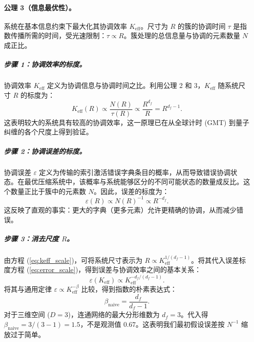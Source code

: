 \documentclass[12pt,a4paper]{article}
\theoremstyle{remark}
\newcommand{\Ke}{K_{\mathrm{eff}}}
\begin{document}
	\paragraph{公理 3（信息最优性）。}
	系统在基本信息约束下最大化其协调效率 \(\Ke\)。尺寸为 \(R\) 的簇的协调时间 \(\tau\) 是指数传播所需的时间，受光速限制：\(\tau \propto R\)。簇处理的总信息量与协调的元素数量 \(N\) 成正比。
	
	\subparagraph*{步骤 1：协调效率的标度。}
	协调效率 \(\Ke\) 定义为协调信息与协调时间之比。利用公理 2 和 3，\(\Ke\) 随系统尺寸 \(R\) 的标度为：
	\begin{equation}
		\Ke(R) \propto \frac{N(R)}{\tau(R)} \propto \frac{R^{d_f}}{R} = R^{d_f - 1}.
		\label{eq:keff_scale}
	\end{equation}
	这表明较大的系统具有较高的协调效率，这一原理已在从全球计时 (GMT) 到量子纠缠的各个尺度上得到验证。
	
	\subparagraph*{步骤 2：协调误差的标度。}
	协调误差 \(\varepsilon\) 定义为传输的索引激活错误字典条目的概率，从而导致错误协调状态。在最优压缩系统中，该概率与系统能够区分的不同可能状态的数量成反比。这个数量正比于簇中的元素数 \(N\)。因此，误差的标度为：
	\begin{equation}
		\varepsilon(R) \propto N(R)^{-1} \propto R^{-d_f}.
		\label{eq:error_scale}
	\end{equation}
	这反映了直观的事实：更大的字典（更多元素）允许更精确的协调，从而减少错误。
	
	\subparagraph*{步骤 3：消去尺度 \(R\)。}
	由方程 (\ref{eq:keff_scale})，可将系统尺寸表示为 \(R \propto \Ke^{1/(d_f-1)}\)。将其代入误差标度方程 (\ref{eq:error_scale})，得到误差与协调效率之间的基本关系：
	\begin{equation}
		\varepsilon(\Ke) \propto \Ke^{-d_f/(d_f-1)}.
		\label{eq:error_keff_naive}
	\end{equation}
	将其与通用定律 \(\varepsilon \propto \Ke^{-\beta}\) 比较，得到指数的朴素表达式：
	\begin{equation}
		\beta_{\text{naive}} = \frac{d_f}{d_f-1}.
		\label{eq:beta_naive}
	\end{equation}
	对于三维空间 (\(D = 3\))，连通网络的最大分形维数为 \(d_f = 3\)。代入得 \(\beta_{\text{naive}} = 3/(3-1) = 1.5\)，不是观测值 \(0.67\)。这表明我们最初假设误差按 \(N^{-1}\) 缩放过于简单。
	
\end{document}
